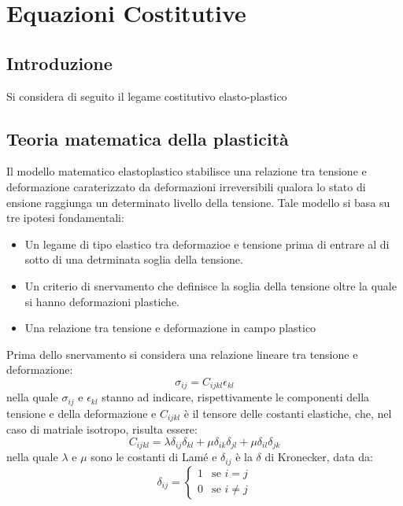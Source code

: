 \chapter{Equazioni Costitutive}
\section{Introduzione}
Si considera di seguito il legame costitutivo elasto-plastico

\section{Teoria matematica della plasticità}
Il modello matematico elastoplastico stabilisce una relazione tra tensione e deformazione caraterizzato da deformazioni irreversibili qualora lo stato di ensione raggiunga un determinato livello della tensione. Tale modello si basa su tre ipotesi fondamentali:
\begin{itemize}
	\item Un legame di tipo elastico tra deformazioe e tensione prima di entrare al di sotto di una detrminata soglia della tensione.
	\item  Un criterio di snervamento che definisce la soglia della tensione oltre la quale si hanno deformazioni plastiche.
	\item Una relazione tra tensione e deformazione in campo plastico
\end{itemize}
	
Prima dello snervamento si considera una relazione lineare tra tensione e deformazione:
\begin{equation}
	\sigma_{ij} = C_{ijkl} \epsilon_{kl}
\end{equation}	
nella quale $\sigma_{ij}$ e $\epsilon_{kl}$ stanno ad indicare, rispettivamente le componenti della tensione e della deformazione e $C_{ijkl}$ è il tensore delle costanti elastiche, che, nel caso di matriale isotropo, risulta essere:
\begin{equation}
	C_{ijkl} = \lambda \delta_{ij} \delta_{kl} + \mu \delta_{ik} \delta_{jl} + \mu \delta_{il} \delta_{jk}
\end{equation}	
nella quale $\lambda$ e $\mu$ sono le costanti di Lamé e $\delta_{ij}$ è la $\delta$ di Kronecker, data da:
\begin{equation}
	\delta_{ij} =
	\begin{cases}
		1 & \text{se $i = j$} \\
		0 & \text{se $i \neq j$}
	\end{cases}
\end{equation}
	
